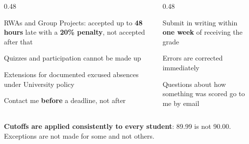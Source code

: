 \documentclass[
    10pt,
    dvipsnames,
    svgnames,
    x11names,
    aspectratio=1610,
    english,
    codeminted]{beamer}
\begin{document}
\begin{frame}{\secname}
\medskip
\begin{columns}[T,onlytextwidth]
\begin{column}{0.48\textwidth}
\begin{compactitem}
\small
    \item RWAs and Group Projects: accepted up to \textbf{48 hours} late with a \textbf{20\% penalty}, not accepted after that
    \item Quizzes and participation cannot be made up
    \item Extensions for documented excused absences under University policy
    \item Contact me \textbf{before} a deadline, not after
\end{compactitem}
\end{column}
\begin{column}{0.48\textwidth}
\begin{compactitem}
\small
    \item Submit in writing within \textbf{one week} of receiving the grade
    \item Errors are corrected immediately
    \item Questions about how something was scored go to me by email
\end{compactitem}
\end{column}
\end{columns}
\medskip
\begin{MyBox}
\textbf{Cutoffs are applied consistently to every student}: 89.99 is not 90.00. Exceptions are not made for some and not others.
\end{MyBox}
\end{frame}
\endgroup



\end{document}
